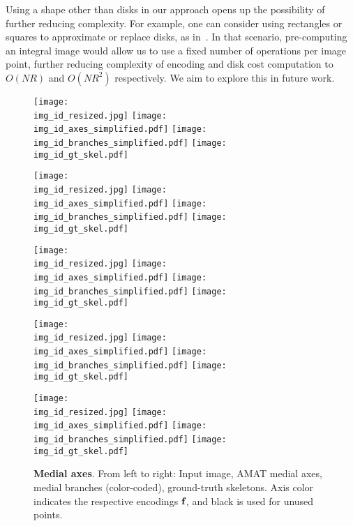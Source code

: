 \documentclass[10pt,twocolumn,letterpaper]{article}
\begin{document}
Using a shape other than disks in our approach opens up the possibility of further reducing complexity.
For example, one can consider using rectangles or squares to approximate or replace disks, 
as in~\cite{arbelaez2011contour,tsogkas2012learning}.
In that scenario, pre-computing an integral image would allow us to use a fixed number of operations per image point, further
reducing complexity of encoding and disk cost computation to $O(NR)$ and $O(NR^2)$ respectively.
We aim to explore this in future work.






\begin{figure*}[t]
\centering
\def\imgw{0.245}

\def\img_id{85048}
\texttt{[image: \\img\_id\_resized.jpg]}
\texttt{[image: \\img\_id\_axes\_simplified.pdf]}
\texttt{[image: \\img\_id\_branches\_simplified.pdf]}
\texttt{[image: \\img\_id\_gt\_skel.pdf]}

\def\img_id{295087}
\texttt{[image: \\img\_id\_resized.jpg]}
\texttt{[image: \\img\_id\_axes\_simplified.pdf]}
\texttt{[image: \\img\_id\_branches\_simplified.pdf]}
\texttt{[image: \\img\_id\_gt\_skel.pdf]}

\def\img_id{145086}
\texttt{[image: \\img\_id\_resized.jpg]}
\texttt{[image: \\img\_id\_axes\_simplified.pdf]}
\texttt{[image: \\img\_id\_branches\_simplified.pdf]}
\texttt{[image: \\img\_id\_gt\_skel.pdf]}

\def\img_id{101087}
\texttt{[image: \\img\_id\_resized.jpg]}
\texttt{[image: \\img\_id\_axes\_simplified.pdf]}
\texttt{[image: \\img\_id\_branches\_simplified.pdf]}
\texttt{[image: \\img\_id\_gt\_skel.pdf]}

\def\img_id{54082}
\texttt{[image: \\img\_id\_resized.jpg]}
\texttt{[image: \\img\_id\_axes\_simplified.pdf]}
\texttt{[image: \\img\_id\_branches\_simplified.pdf]}
\texttt{[image: \\img\_id\_gt\_skel.pdf]}
\caption{\textbf{Medial axes}. From left to right: Input image, AMAT medial axes, medial branches (color-coded), ground-truth skeletons.
Axis color indicates the respective encodings $\mathbf{f}_{}$, and black is used for unused points.}
\label{fig:axes}
\end{figure*}
\end{document}
